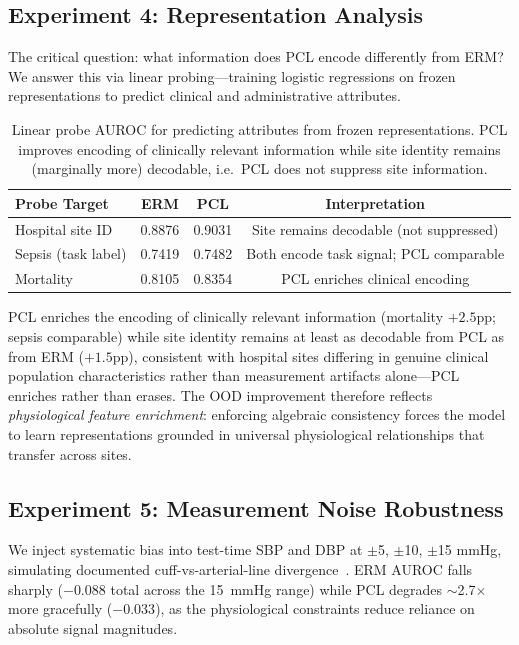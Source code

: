 \documentclass{article}
\begin{document}
\subsection{Experiment 4: Representation Analysis}
\label{sec:exp4}

The critical question: what information does PCL encode differently from ERM?
We answer this via linear probing---training logistic regressions on frozen representations to predict clinical and administrative attributes.

\begin{table}[htbp]
\caption{Linear probe AUROC for predicting attributes from frozen representations. PCL improves encoding of clinically relevant information while site identity remains (marginally more) decodable, i.e.\ PCL does not suppress site information.}
\label{tab:probes}
\centering
\small
\begin{tabular}{@{}lccc@{}}
\toprule
Probe Target & ERM & PCL & Interpretation \\
\midrule
Hospital site ID & 0.8876 & 0.9031 & Site remains decodable (not suppressed) \\
Sepsis (task label) & 0.7419 & 0.7482 & Both encode task signal; PCL comparable \\
Mortality & 0.8105 & 0.8354 & PCL enriches clinical encoding \\
\bottomrule
\end{tabular}
\end{table}

PCL enriches the encoding of clinically relevant information (mortality $+2.5$pp; sepsis comparable) while site identity remains at least as decodable from PCL as from ERM ($+1.5$pp), consistent with hospital sites differing in genuine clinical population characteristics rather than measurement artifacts alone---PCL enriches rather than erases.
The OOD improvement therefore reflects \emph{physiological feature enrichment}: enforcing algebraic consistency forces the model to learn representations grounded in universal physiological relationships that transfer across sites.

\subsection{Experiment 5: Measurement Noise Robustness}
\label{sec:exp5}

We inject systematic bias into test-time SBP and DBP at $\pm$5, $\pm$10, $\pm$15 mmHg, simulating documented cuff-vs-arterial-line divergence~\citep{wax2011invasive}.
ERM AUROC falls sharply ($-0.088$ total across the 15~mmHg range) while PCL degrades $\sim$2.7$\times$ more gracefully ($-0.033$), as the physiological constraints reduce reliance on absolute signal magnitudes.
\end{document}
